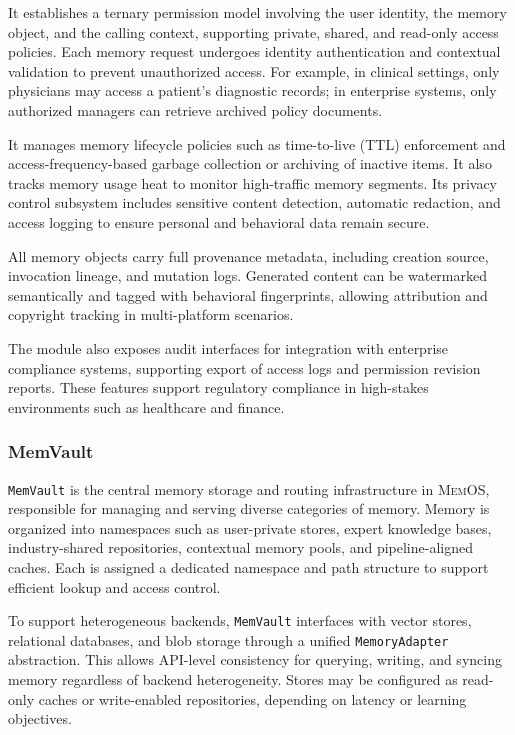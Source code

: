 \documentclass[]{memtensor}
\begin{document}
It establishes a ternary permission model involving the user identity, the memory object, and the calling context, supporting private, shared, and read-only access policies.
Each memory request undergoes identity authentication and contextual validation to prevent unauthorized access.
For example, in clinical settings, only physicians may access a patient’s diagnostic records; in enterprise systems, only authorized managers can retrieve archived policy documents.

It manages memory lifecycle policies such as time-to-live (TTL) enforcement and access-frequency-based garbage collection or archiving of inactive items.
It also tracks memory usage heat to monitor high-traffic memory segments.
Its privacy control subsystem includes sensitive content detection, automatic redaction, and access logging to ensure personal and behavioral data remain secure.

All memory objects carry full provenance metadata, including creation source, invocation lineage, and mutation logs.
Generated content can be watermarked semantically and tagged with behavioral fingerprints, allowing attribution and copyright tracking in multi-platform scenarios.

The module also exposes audit interfaces for integration with enterprise compliance systems, supporting export of access logs and permission revision reports.
These features support regulatory compliance in high-stakes environments such as healthcare and finance.

\subsubsection{MemVault}
\texttt{MemVault} is the central memory storage and routing infrastructure in \textsc{MemOS}, responsible for managing and serving diverse categories of memory.
Memory is organized into namespaces such as user-private stores, expert knowledge bases, industry-shared repositories, contextual memory pools, and pipeline-aligned caches.
Each is assigned a dedicated namespace and path structure to support efficient lookup and access control.

To support heterogeneous backends, \texttt{MemVault} interfaces with vector stores, relational databases, and blob storage through a unified \texttt{MemoryAdapter} abstraction.
This allows API-level consistency for querying, writing, and syncing memory regardless of backend heterogeneity.
Stores may be configured as read-only caches or write-enabled repositories, depending on latency or learning objectives.
\end{document}
